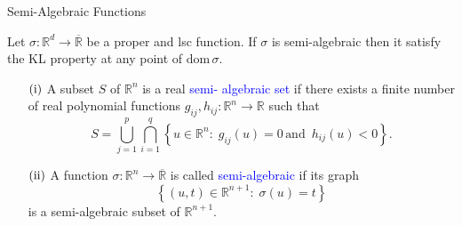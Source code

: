 \documentclass[9pt,handout]{beamer} %
\newcommand{\s}{\sigma}
\newcommand{\rr}{\mathbb{R}} %
\newcommand{\dom}[1]{\mathrm{dom}\,{#1}} %
\begin{document}
	\begin{frame}{Semi-Algebraic Functions}
        \begin{theorem}
            Let $\s : \rr^{d} \rightarrow \overline{\rr}$ be a proper and lsc function. If 
            $\s$ is semi-algebraic then it satisfy the KL property at any point of 
            $\dom{\s}$.
        \end{theorem}
		\vspace{0.3in}
        \begin{definition}
            \begin{itemize}
                \item[$\rm{(i)}$] A subset $S$ of $\rr^{n}$ is a real \textcolor{blue}{semi-
                	algebraic set} if there exists a finite number of real polynomial 
                	functions $g_{ij} , h_{ij} : \rr^{n} \rightarrow \rr$ such that
                    \begin{equation*}
                        S = \bigcup_{j = 1}^{p} \bigcap_{i = 1}^{q} \left\{ u \in \rr^{n} : 
                        \; g_{ij}\left(u\right) = 0 \, \text{and } \, h_{ij}\left(u\right) < 
                        0 \right\}.
                    \end{equation*}
                \item[$\rm{(ii)}$] A function $\s : \rr^{n} \rightarrow \overline{\rr}$ is 
                	called \textcolor{blue}{semi-algebraic} if its graph
                    \begin{equation*}
                        \left\{ \left(u , t\right) \in \rr^{n + 1} : \; \s\left(u\right) = t 
                        \right\}
                    \end{equation*}
                    is a semi-algebraic subset of $\rr^{n + 1}$.
            \end{itemize}
        \end{definition}
    \end{frame}
\end{document}
